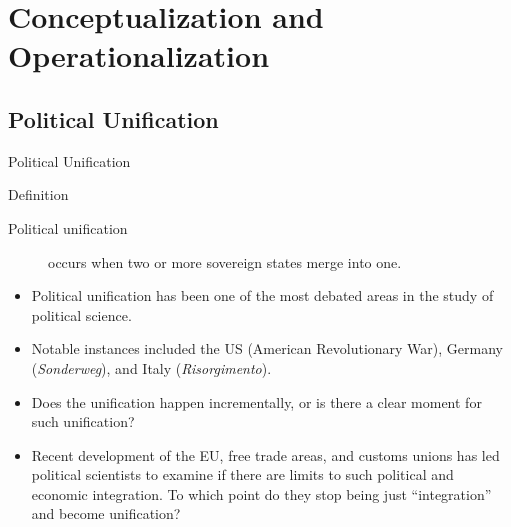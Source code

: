 \documentclass{beamer}
\begin{document}
	\section{Conceptualization and Operationalization}
	\subsection{Political Unification}
	\begin{frame}{Political Unification}
		\begin{block}{Definition}
			\begin{description}
				\item[Political unification] occurs when two or more sovereign states merge into one.
			\end{description}
		\end{block}
		\begin{itemize}
			\item Political unification has been one of the most debated areas in the study of political science.
			\item Notable instances included the US (American Revolutionary War), Germany (\textit{Sonderweg}), and Italy (\textit{Risorgimento}).
			\item Does the unification happen incrementally, or is there a clear moment for such unification?
			\item Recent development of the EU, free trade areas, and customs unions has led political scientists to examine if there are limits to such political and economic integration. To which point do they stop being just ``integration'' and become unification?
		\end{itemize}
	\end{frame}
\end{document}
